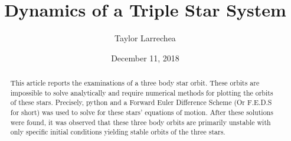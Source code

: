 \documentclass[]{article}
\title{\textbf{Dynamics of a Triple Star System}}
\author{Taylor Larrechea}
\affil{Colorado Mesa University}
\affil{Department of Physical and Environmental Sciences}
\date{December 11, 2018}
\begin{document}
\maketitle
\begin{abstract}
\paragraph{}
\setlength{\parskip}{1em}
This article reports the examinations of a three body star orbit. These orbits are impossible to solve analytically and require numerical methods for plotting the orbits of these stars. Precisely, python and a Forward Euler Difference Scheme (Or F.E.D.S for short) was used to solve for these stars' equations of motion. After these solutions were found, it was observed that these three body orbits are primarily unstable with only specific initial conditions yielding stable orbits of the three stars.
\par
\end{abstract}
\end{document}
